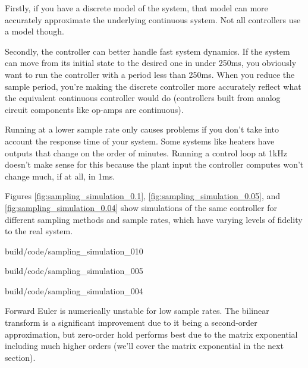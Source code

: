 Firstly, if you have a discrete \gls{model} of the \gls{system}, that
\gls{model} can more accurately approximate the underlying continuous
\gls{system}. Not all controllers use a \gls{model} though.

Secondly, the controller can better handle fast \gls{system} dynamics. If the
\gls{system} can move from its initial state to the desired one in under 250ms,
you obviously want to run the controller with a period less than 250ms. When you
reduce the sample period, you're making the discrete controller more accurately
reflect what the equivalent continuous controller would do (controllers built
from analog circuit components like op-amps are continuous).

Running at a lower sample rate only causes problems if you don't take into
account the response time of your \gls{system}. Some \glspl{system} like heaters
have \glspl{output} that change on the order of minutes. Running a control loop
at 1kHz doesn't make sense for this because the \gls{plant} \gls{input} the
controller computes won't change much, if at all, in 1ms.

Figures \ref{fig:sampling_simulation_0.1}, \ref{fig:sampling_simulation_0.05},
and \ref{fig:sampling_simulation_0.04} show simulations of the same controller
for different sampling methods and sample rates, which have varying levels of
fidelity to the real \gls{system}.

\begin{svg}{build/code/sampling_simulation_010}
  \caption{Sampling methods for system simulation with $T = 0.1s$}
  \label{fig:sampling_simulation_0.1}
\end{svg}

\begin{svg}{build/code/sampling_simulation_005}
  \caption{Sampling methods for system simulation with $T = 0.05s$}
  \label{fig:sampling_simulation_0.05}
\end{svg}

\begin{svg}{build/code/sampling_simulation_004}
  \caption{Sampling methods for system simulation with $T = 0.04s$}
  \label{fig:sampling_simulation_0.04}
\end{svg}

Forward Euler is numerically unstable for low sample rates. The bilinear
transform is a significant improvement due to it being a second-order
approximation, but zero-order hold performs best due to the matrix exponential
including much higher orders (we'll cover the matrix exponential in the next
section).

